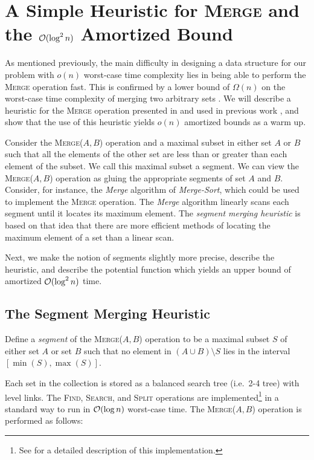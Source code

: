 \documentclass[11pt]{article}
\newcommand{\kwMs}{Make-Set}
\newcommand{\kwSpl}{Split}
\newcommand{\kwUnion}{Merge}
\newcommand{\kwSrc}{Search}
\newcommand{\kwFind}{Find}
\newcommand{\Ms}{\mbox{\textsc{\kwMs}}}
\newcommand{\Spl}{\mbox{\textsc{\kwSpl}}}
\newcommand{\Union}{\mbox{\textsc{\kwUnion{}}}}
\newcommand{\Unionx}[2]{\mbox{\textsc{\kwUnion(\ensuremath{#1,#2})}}}
\newcommand{\Src}{\mbox{\textsc{\kwSrc}}}
\newcommand{\Find}{\mbox{\textsc{\kwFind}}}
\newcommand{\segments}{{\segment}s}
\newcommand{\segment}{segment}
\newcommand{\Segment}{Segment}
\newcommand{\intmax}[1]{\ensuremath{\max(\intl #1)}}
\newcommand{\intmin}[1]{\ensuremath{\min(\intl #1)}}
\newcommand{\intl}[1]{\ensuremath{#1}}
\newcommand{\set}[1]{\ensuremath{#1}}
\newcommand{\hide}[1]{}
\begin{document}
\section{A Simple Heuristic for \Union{} and the ${\cal O}(\log^2 n)$ Amortized Bound} 
\label{sec:LogSQ} 


As mentioned previously, the main difficulty in designing a data structure for our problem with  $o(n)$ worst-case time complexity lies in being able to perform the \Union{} operation fast. This is confirmed by a lower bound of $\Omega(n)$ on the worst-case time complexity of merging two arbitrary sets \cite{conf/soda/DemaineLM00}. We will describe a heuristic for the \Union{} operation presented in \cite{conf/soda/DemaineLM00} and used in previous work \cite{DBLP:journals/talg/GeorgiadisKSTW11, klaithesis}, and show that the use of this heuristic yields $o(n)$ amortized bounds as a warm up. 


Consider the \Unionx{A}{B} operation and a maximal subset in either set \set A or \set B such that all the elements of the other set are less than or greater than each element of the subset. We call this maximal subset a \segment. We can view the \Unionx{A}{B} operation as gluing the appropriate \segments{} of set \set A and \set B. Consider, for instance, the \textit{Merge} algorithm of \textit{Merge-Sort}, which could be used to implement the \Union{} operation. The \textit{Merge} algorithm linearly scans each \segment{} until it locates its maximum element. The \textit{\segment{} merging heuristic} is based on that idea that there are more efficient methods of locating the maximum element of a set than a linear scan. 



Next, we make the notion of \segments{} slightly more precise, describe the heuristic, and describe the potential function which yields an upper bound of amortized ${\cal O}(\log^2 n)$ time. 


\subsection{The \Segment{} Merging Heuristic} 
\label{subsec:LogSQIntSubApp} 

Define a \emph{\segment} of the \Unionx{A}{B} operation to be a maximal subset \intl S of either set \set A or set \set B such that no element in $(\set A \cup \set B) \setminus \intl S$ lies in the interval $[\intmin{S},\intmax{S}]$. 
  
Each set in the collection is stored as a balanced search tree (i.e.~2-4 tree) with level links. The \hide{\Ms{}, }\Find{}, \Src{}, and \Spl{} operations are implemented\footnote{See \cite{klaithesis} for a detailed description of this implementation.} in a standard way to run in ${\cal O}(\log n)$ worst-case time. The \Unionx{A}{B} operation is performed as follows: 
  
\end{document}
